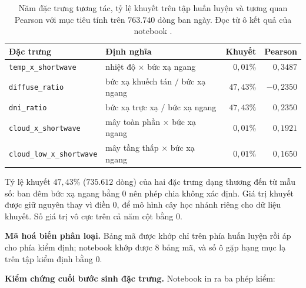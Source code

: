 \begin{table}[htbp]
\centering

\small
\begin{tabular}{@{}L{5.0cm} L{4.6cm} r r@{}}
\toprule
\textbf{Đặc trưng} & \textbf{Định nghĩa} & \textbf{Khuyết} & \textbf{Pearson} \\
\midrule
\texttt{temp\_x\_shortwave} & nhiệt độ $\times$ bức xạ ngang & $0{,}01\%$ & $0{,}3487$ \\
\texttt{diffuse\_ratio} & bức xạ khuếch tán $/$ bức xạ ngang & $47{,}43\%$ & $-0{,}2350$ \\
\texttt{dni\_ratio} & bức xạ trực xạ $/$ bức xạ ngang & $47{,}43\%$ & $0{,}2350$ \\
\texttt{cloud\_x\_shortwave} & mây toàn phần $\times$ bức xạ ngang & $0{,}01\%$ & $0{,}1921$ \\
\texttt{cloud\_low\_x\_shortwave} & mây tầng thấp $\times$ bức xạ ngang & $0{,}01\%$ & $0{,}1650$ \\
\bottomrule
\end{tabular}
\caption[Năm đặc trưng tương tác, tỷ lệ khuyết trên tập huấn luyện và tương quan Pearson với mục tiêu]{Năm đặc trưng tương tác, tỷ lệ khuyết trên tập huấn luyện và tương quan Pearson với
mục tiêu tính trên $763.740$ dòng ban ngày. Đọc từ ô kết quả của notebook
.}
\label{tab:tuong_tac}
\end{table}

Tỷ lệ khuyết $47{,}43\%$ ($735.612$ dòng) của hai đặc trưng dạng thương đến từ mẫu số: ban
đêm bức xạ ngang bằng $0$ nên phép chia không xác định. Giá trị khuyết được giữ nguyên thay
vì điền $0$, để mô hình cây học nhánh riêng cho dữ liệu khuyết. Số giá trị vô cực trên cả
năm cột bằng $0$.

\textbf{Mã hoá biến phân loại.} Bảng mã được khớp chỉ trên phía huấn luyện rồi áp
cho phía kiểm định; notebook khớp được $8$ bảng mã, và số ô gặp hạng mục lạ trên tập kiểm
định bằng $0$.

\textbf{Kiểm chứng cuối bước sinh đặc trưng.} Notebook in ra ba phép kiểm:

